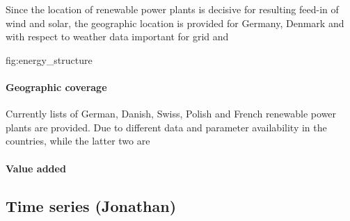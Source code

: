 \documentclass[article]{elsarticle}
\begin{document}
Since the location of renewable power plants is decisive for resulting feed-in of wind and solar, the geographic location is provided for Germany, Denmark and with respect to weather data important for grid and 

fig:energy_structure

\paragraph{Geographic coverage} Currently lists of German, Danish, Swiss, Polish and French renewable power plants are provided. Due to different data and parameter availability in the countries,  while the latter two  are 

\paragraph{Value added}


\subsection{Time series (Jonathan)}
\label{subsec:time series}
\end{document}
